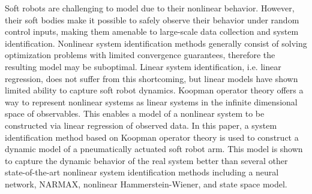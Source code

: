 Soft robots are challenging to model due to their nonlinear behavior.
However, their soft bodies make it possible to safely observe their behavior under random control inputs, making them amenable to large-scale data collection and system identification.
Nonlinear system identification methods generally consist of solving optimization problems with limited convergence guarantees, therefore the resulting model may be suboptimal.
Linear system identification, i.e. linear regression, does not suffer from this shortcoming, but linear models have shown limited ability to capture soft robot dynamics.
Koopman operator theory offers a way to represent nonlinear systems as linear systems in the infinite dimensional space of observables.
This enables a model of a nonlinear system to be constructed via linear regression of observed data.
In this paper, a system identification method based on Koopman operator theory is used to construct a dynamic model of a pneumatically actuated soft robot arm.
This model is shown to capture the dynamic behavior of the real system  better than several other  state-of-the-art  nonlinear  system identification  methods  including  a  neural  network, NARMAX, nonlinear Hammerstein-Wiener, and state space model.